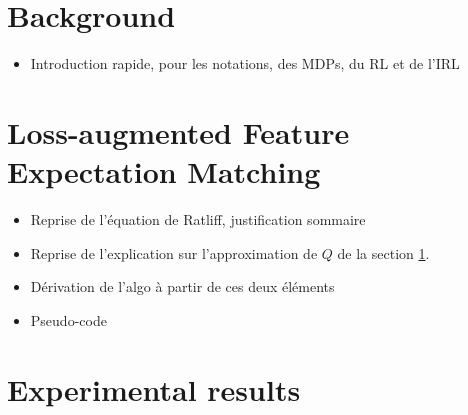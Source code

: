 \documentclass[publibook-draft]{CAp2012}
\begin{document}
\section{Background}
\label{back.sec}
\begin{itemize}
\item Introduction rapide, pour les notations, des MDPs, du RL et de l'IRL
\end{itemize}
\section{Loss-augmented Feature Expectation Matching}
\begin{itemize}
\item Reprise de l'équation de Ratliff, justification sommaire
\item Reprise de l'explication sur l'approximation de $Q$ de la section \ref{back.sec}.
\item Dérivation de l'algo à partir de ces deux éléments
\item Pseudo-code
\end{itemize}
\section{Experimental results}
\end{document}
